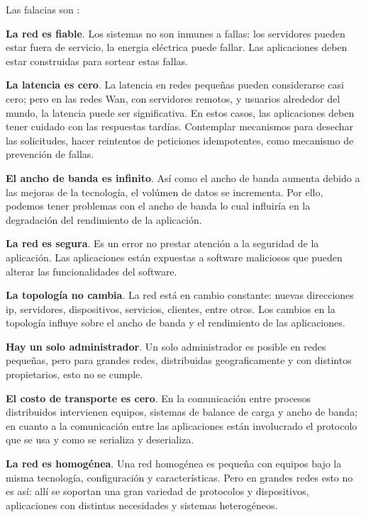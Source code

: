 Las falacias son  :
\begin{description}
	\item \textbf{La red es fiable}.
	 Los sistemas no son inmunes a fallas: los servidores pueden estar fuera de servicio, la energia eléctrica puede fallar. Las aplicaciones deben estar construidas para sortear estas fallas.
	\item \textbf{La latencia es cero}. 
	La \gls{latencia} en redes pequeñas pueden considerarse casi cero; pero en las redes Wan, con servidores remotos, y usuarios alrededor del mundo, la latencia puede ser significativa.
	En estos casos, las aplicaciones deben tener cuidado con las respuestas tardías. Contemplar mecanismos para desechar las solicitudes, hacer reintentos de \gls{peticiones idempotentes}, como mecanismo de prevención de fallas.
	\item \textbf{El ancho de banda es infinito}.
	Así como el ancho de banda aumenta debido a las mejoras de la tecnología, el volúmen de datos se incrementa. Por ello,  podemos  tener problemas con el ancho de banda lo cual influiría en la degradación del rendimiento de la aplicación.
	\item \textbf{La red es segura}.
	Es un error no prestar atención a la seguridad de la aplicación. Las aplicaciones están expuestas a software maliciosos que pueden alterar las funcionalidades del software.
	\item \textbf{La topología no cambia}.
	La red está en cambio constante: nuevas direcciones ip, servidores, dispositivos, servicios, clientes,  entre otros. Los cambios en la topología influye sobre el ancho de banda y el rendimiento de las aplicaciones.	
	\item \textbf{Hay un solo administrador}.
	Un solo administrador es posible en redes pequeñas, pero para  grandes redes, distribuidas geograficamente y con distintos propietarios, esto no se cumple. 
	\item \textbf{El costo de transporte es cero}.
 	En la comunicación entre procesos distribuidos intervienen equipos, sistemas de balance de carga y ancho de banda; en cuanto a la comunicación entre las aplicaciones están involucrado el protocolo que se usa y como se serializa y deserializa.
	\item \textbf{La red es homogénea}.
	Una red homogénea es  pequeña con equipos bajo la misma tecnología, configuración y características. Pero en grandes redes esto no es así: allí se soportan una gran variedad de protocolos y dispositivos, aplicaciones con distintas necesidades y sistemas heterogéneos.
	
	
\end{description}


